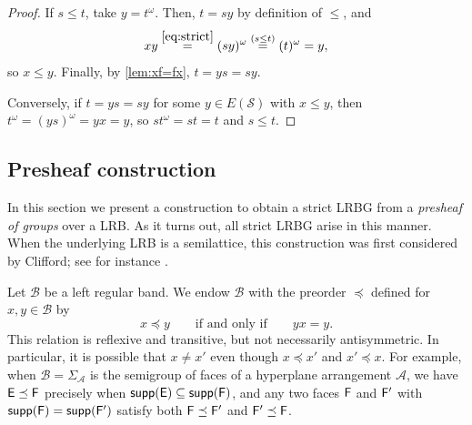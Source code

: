 \documentclass[11pt, oneside, reqno]{amsart}
\theoremstyle{definition}
\numberwithin{equation}{section}
\def \A{{\mathcal{A}}}
\def \BB{{\mathcal{B}}}
\def \SS{{\mathcal{S}}}
\def\qqiff{\qquad\text{if and only if}\qquad}
\def \supp{\mathsf{supp}}
\begin{document}
\begin{proof}
    If $s \leq t$, take $y = t^\omega$. Then, $t = s y$ by definition of $\leq$, and
    \[
        x y                 \overset{\cref{eq:strict}}{=}
        (s y)^\omega        \overset{(s \leq t)}{=}
        (t)^\omega = y,
    \]
    so $x \leq y$. Finally, by \cref{lem:xf=fx}, $t = ys = sy$.

    Conversely, if $t = ys = sy$ for some $y \in E(\SS)$ with $x \leq y$, then $t^\omega = (y s) ^\omega = y x = y$, so $s t^\omega = s t = t$ and $s \leq t$.
\end{proof}

\subsection{Presheaf construction}

In this section we present a construction to obtain a strict LRBG from a {\em presheaf of groups} over a LRB.
As it turns out, all strict LRBG arise in this manner.
When the underlying LRB is a semilattice, this construction was first
considered by Clifford; see for instance \cite[Theorem 4.11]{cp61semigroupsI}.

Let $\BB$ be a left regular band. We endow $\BB$ with the preorder $\preceq$
defined for $x, y \in \BB$ by
\begin{equation*}
    x \preceq y
    \qqiff
    y x = y.
\end{equation*}
This relation is reflexive and transitive, but not necessarily antisymmetric.
In particular, it is possible that $x \neq x'$ even though $x \preceq x'$ and $x' \preceq x$.
For example, when $\BB = \Sigma_{\A}$ is the semigroup of faces of a hyperplane
arrangement $\A$, we have ${\sf E} \preceq {\sf F}$ precisely when $\supp({\sf
E}) \subseteq \supp({\sf F})$, and any two faces ${\sf F}$ and ${\sf F'}$
with $\supp({\sf F}) = \supp({\sf F'})$ satisfy both
${\sf F} \preceq {\sf F'}$ and ${\sf F'} \preceq {\sf F}$.
\end{document}

